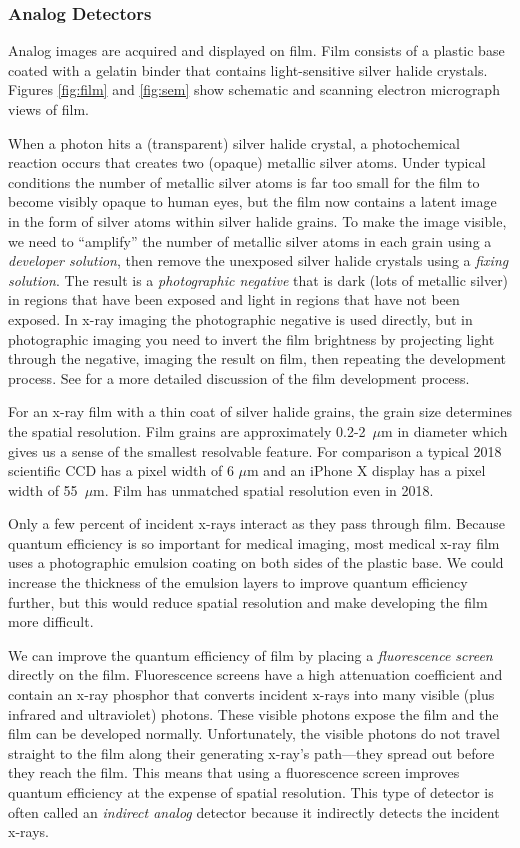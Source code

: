 \documentclass[mphy386-notes.tex]{subfiles}
\begin{document}
\subsubsection*{Analog Detectors}
Analog images are acquired and displayed on film. Film consists of a plastic
base coated with a gelatin binder that contains light-sensitive silver halide
crystals. Figures \ref{fig:film} and \ref{fig:sem} show schematic and scanning
electron micrograph views of film.

When a photon hits a (transparent) silver halide crystal, a photochemical
reaction occurs that creates two (opaque) metallic silver atoms. Under typical
conditions the number of metallic silver atoms is far too small for the film to
become visibly opaque to human eyes, but the film now contains a latent image in
the form of silver atoms within silver halide grains. To make the image visible,
we need to ``amplify'' the number of metallic silver atoms in each grain using a
\textit{developer solution}, then remove the unexposed silver halide crystals
using a \textit{fixing solution}. The result is a \textit{photographic negative}
that is dark (lots of metallic silver) in regions that have been exposed and
light in regions that have not been exposed. In x-ray imaging the photographic
negative is used directly, but in photographic imaging you need to invert the
film brightness by projecting light through the negative, imaging the result on
film, then repeating the development process. See \cite{barrett, stack} for a more
detailed discussion of the film development process.

For an x-ray film with a thin coat of silver halide grains, the grain size
determines the spatial resolution. Film grains are approximately 0.2-2~$\mu$m in
diameter which gives us a sense of the smallest resolvable feature. For
comparison a typical 2018 scientific CCD has a pixel width of 6 $\mu$m and an
iPhone X display has a pixel width of 55~$\mu$m. Film has unmatched spatial
resolution even in 2018.

Only a few percent of incident x-rays interact as they pass through film.
Because quantum efficiency is so important for medical imaging, most medical
x-ray film uses a photographic emulsion coating on both sides of the plastic
base. We could increase the thickness of the emulsion layers to improve quantum
efficiency further, but this would reduce spatial resolution and make developing
the film more difficult.

We can improve the quantum efficiency of film by placing a \textit{fluorescence
  screen} directly on the film. Fluorescence screens have a high attenuation
coefficient and contain an x-ray phosphor that converts incident x-rays into
many visible (plus infrared and ultraviolet) photons. These visible photons
expose the film and the film can be developed normally. Unfortunately, the
visible photons do not travel straight to the film along their generating
x-ray's path---they spread out before they reach the film. This means that using
a fluorescence screen improves quantum efficiency at the expense of spatial
resolution. This type of detector is often called an \textit{indirect analog}
detector because it indirectly detects the incident x-rays.
\end{document}
